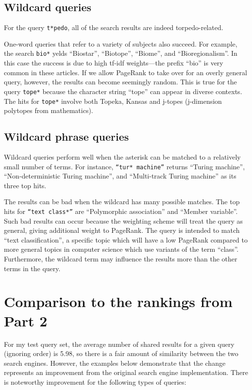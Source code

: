 \documentclass[11pt]{article}
\begin{document}
\subsection*{Wildcard queries}

For the query \texttt{t*pedo}, all of the search results are indeed torpedo-related.

One-word queries that refer to a variety of subjects also succeed. For example, the search
\texttt{bio*} yelds ``Biostar'', ``Biotope'', ``Biome'', and ``Bioregionalism''. In this case the success
is due to high tf-idf weights---the prefix ``bio'' is very common in these articles. If we allow PageRank
to take over for an overly general query, however, the results can become seemingly random. This is true
for the query \texttt{tope*} because the character string ``tope'' can appear in diverse contexts. The hits
for \texttt{tope*} involve both Topeka, Kansas and j-topes (j-dimension polytopes from mathematics).

\subsection*{Wildcard phrase queries}

Wildcard queries perform well when the asterisk can be matched to a relatively small number
of terms. For instance, \texttt{``tur* machine''} returns ``Turing machine'', ``Non-deterministic Turing machine'',
and ``Multi-track Turing machine'' as its three top hits.

The results can be bad when the wildcard has many possible matches. The top hits for \texttt{``text class*''}
are ``Polymorphic association'' and ``Member variable''. Such bad results can occur because the weighting scheme will
 treat the query as general, giving additional weight to PageRank.
The query is intended to match ``text classification'', a specific topic which will have a low PageRank compared
to more general topics in computer science which use variants of the term ``class''.
Furthermore, the wildcard term may influence the results more than the other terms in the query. 


\section{Comparison to the rankings from Part 2}

For my test query set, the average number of shared results for a given query (ignoring order) is
5.98, so there is a fair amount of similarity between the two search engines. However, the examples
below demonstrate that the change represents an improvement from the original search engine implementation.
There is noteworthy improvement for the following types of queries:
\end{document}
